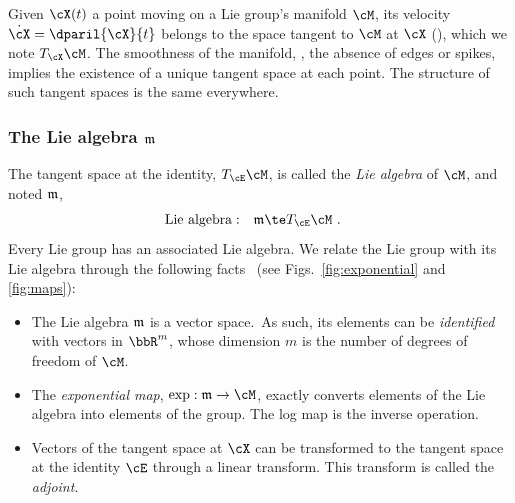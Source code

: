Given $\cX(t)$ a point moving on a Lie group's manifold $\cM$, its velocity $\dot\cX=\dparil{\cX}{t}$ belongs to the space tangent to $\cM$ at $\cX$ (),
which we note $\mtanat{\cM}{\cX}$.
The smoothness of the manifold, \ie, the absence of edges or spikes, implies the existence of a unique tangent space at each point.
The structure of such tangent spaces is the same everywhere. 





\subsubsection[The Lie algebra]{The Lie algebra $\frak{m}$}

The tangent space at the identity, $\mtanat{\cM}{\cE}$, is called the \emph{Lie algebra} of $\cM$, and noted $\frak{m}$,
%
\begin{align}
\textrm{Lie algebra}&:&\frak{m} &\te \mtanat{\cM}{\cE}~.
\end{align}
%
Every Lie group has an associated Lie algebra.
We relate the Lie group with its Lie algebra through the following facts~\cite{EADE-Lie} (see Figs.~\ref{fig:exponential} and \ref{fig:maps}):
\begin{itemize}
\item
The Lie algebra $\frak{m}$ is a vector space.\footnotemark\ 
As such, its elements can be \emph{identified} with vectors in $\bbR^m$, whose dimension $m$ is the number of degrees of freedom of $\cM$.
\item
The \emph{exponential map}, $\exp:\frak{m}\to\cM$, exactly converts elements of the Lie algebra into elements of the group. The log map is the inverse operation.
\item
Vectors of the tangent space at $\cX$ can be transformed to the tangent space at the identity $\cE$ 
through a linear transform. This transform is called the \emph{adjoint}.
\end{itemize}
%
%


